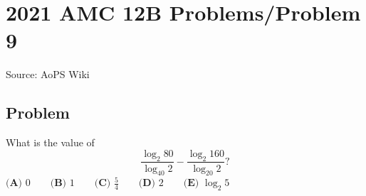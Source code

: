 \documentclass[12pt]{article}
\begin{document}
\section*{{2021 AMC 12B Problems/Problem 9}}
Source: AoPS Wiki

\subsection*{Problem}
What is the value of \[\frac{\log_2 80}{\log_{40}2}-\frac{\log_2 160}{\log_{20}2}?\] $\textbf{(A) }0 \qquad \textbf{(B) }1 \qquad \textbf{(C) }\frac54 \qquad \textbf{(D) }2 \qquad \textbf{(E) }\log_2 5$
\end{document}
